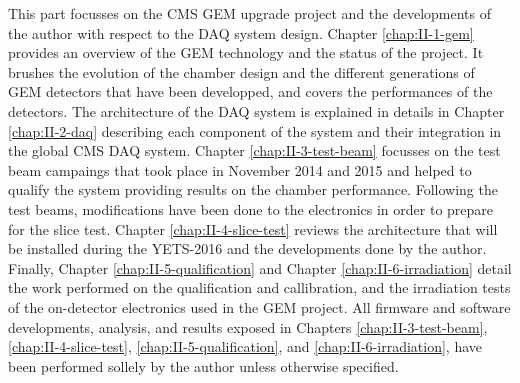 This part focusses on the CMS GEM upgrade project and the developments of the author with respect to the DAQ system design. Chapter \ref{chap:II-1-gem} provides an overview of the GEM technology and the status of the project. It brushes the evolution of the chamber design and the different generations of GEM detectors that have been developped, and covers the performances of the detectors. The architecture of the DAQ system is explained in details in Chapter \ref{chap:II-2-daq} describing each component of the system and their integration in the global CMS DAQ system. Chapter \ref{chap:II-3-test-beam} focusses on the test beam campaings that took place in November 2014 and 2015 and helped to qualify the system providing results on the chamber performance. Following the test beams, modifications have been done to the electronics in order to prepare for the slice test. Chapter \ref{chap:II-4-slice-test} reviews the architecture that will be installed during the YETS-2016 and the developments done by the author. Finally, Chapter \ref{chap:II-5-qualification} and Chapter \ref{chap:II-6-irradiation} detail the work performed on the qualification and callibration, and the irradiation tests of the on-detector electronics used in the GEM project. All firmware and software developments, analysis, and results exposed in Chapters \ref{chap:II-3-test-beam}, \ref{chap:II-4-slice-test}, \ref{chap:II-5-qualification}, and \ref{chap:II-6-irradiation}, have been performed sollely by the author unless otherwise specified.
